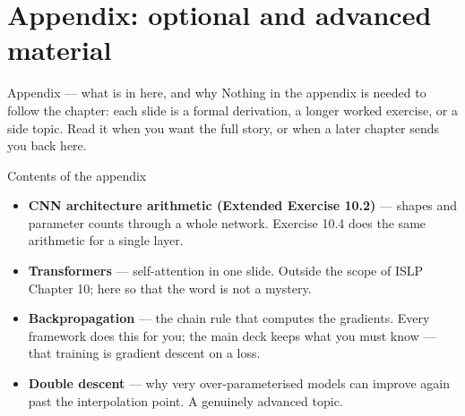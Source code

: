 \documentclass[aspectratio=169,11pt]{beamer}
\begin{document}
\section{Appendix: optional and advanced material}

\begin{frame}{Appendix --- what is in here, and why}
  \small
  Nothing in the appendix is needed to follow the chapter: each slide is a
  formal derivation, a longer worked exercise, or a side topic. Read it when
  you want the full story, or when a later chapter sends you back here.
  \begin{block}{Contents of the appendix}
    \begin{itemize}
      \item \textbf{CNN architecture arithmetic (Extended Exercise 10.2)} --- shapes and parameter counts through a whole network. Exercise 10.4 does the same arithmetic for a single layer.
      \item \textbf{Transformers} --- self-attention in one slide. Outside the scope of ISLP Chapter 10; here so that the word is not a mystery.
      \item \textbf{Backpropagation} --- the chain rule that computes the gradients. Every framework does this for you; the main deck keeps what you must know --- that training is gradient descent on a loss.
      \item \textbf{Double descent} --- why very over-parameterised models can improve again past the interpolation point. A genuinely advanced topic.
    \end{itemize}
  \end{block}
\end{frame}
\end{document}
